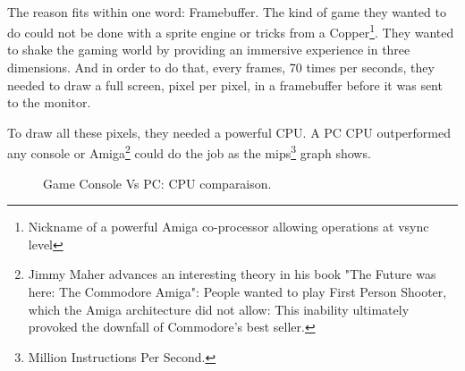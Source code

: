 \\
The reason fits within one word: Framebuffer. The kind of game they wanted to do could not be done with a sprite engine or tricks from a Copper\footnote{Nickname of a powerful Amiga co-processor allowing operations at vsync level}. They wanted to shake the gaming world by providing an immersive experience in three dimensions. And in order to do that, every frames, 70 times per seconds, they needed to draw a full screen, pixel per pixel, in a framebuffer before it was sent to the monitor. \\
\par
To draw all these pixels, they needed a powerful CPU. A PC CPU outperformed any console or Amiga\footnote{Jimmy Maher advances an interesting theory in his book "The Future was here: The Commodore Amiga": People wanted to play First Person Shooter, which the Amiga architecture did not allow: This inability ultimately provoked the downfall of Commodore's best seller.} could do the job as the mips\footnote{Million Instructions Per Second.} graph shows.
\par
\begin{figure}[H]
\centering
   \caption{Game Console Vs PC: CPU comparaison.} \label{fig:game_console_vs_PC}
 \end{figure}
 
